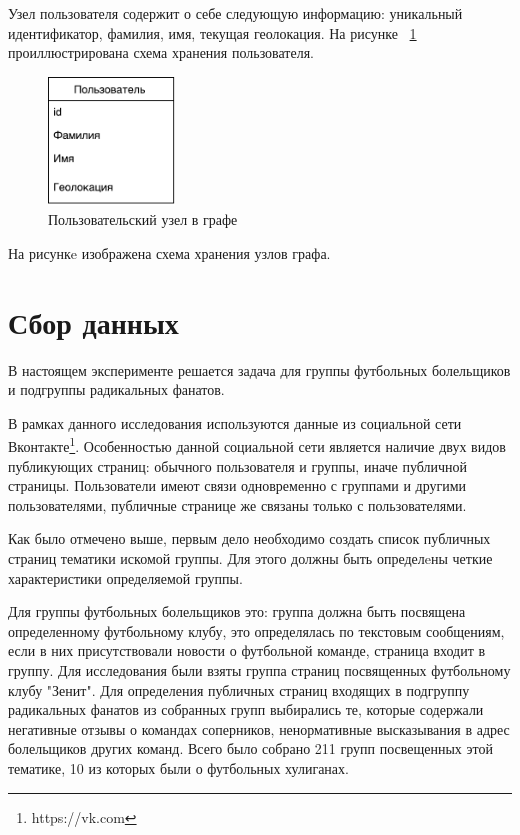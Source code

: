 \documentclass[annotation,times,page4]{itmo-student-thesis}
\begin{document}
Узел пользователя содержит о себе следующую информацию: уникальный идентификатор, фамилия, имя, текущая геолокация. На рисунке ~\ref{fig:user} проиллюстрирована схема хранения пользователя.

\begin{figure}[!h]
\caption{Пользовательский узел в графе}
\label{fig:user}
\centering
\includegraphics[width=0.3\textwidth]{figs/user.pdf}
\end{figure}

\newpage
На рисункe изображена схема хранения узлов графа.    

\section{Сбор данных}
В настоящем эксперименте решается задача для группы футбольных болельщиков и подгруппы радикальных фанатов.

В рамках данного исследования используются данные из социальной сети Вконтакте\footnote{https://vk.com}. Особенностью данной социальной сети является наличие двух видов публикующих страниц: обычного пользователя и группы, иначе публичной страницы. Пользователи имеют связи одновременно с группами и другими пользователями, публичные странице же связаны только с пользователями. 

Как было отмечено выше, первым дело необходимо создать список публичных страниц тематики искомой группы. 
Для этого должны быть определeны четкие характеристики определяемой группы.

Для группы футбольных болельщиков это: группа должна быть посвящена определенному футбольному клубу, это определялась по текстовым сообщениям, если в них присутствовали новости о футбольной команде, страница входит в группу. Для исследования были взяты группа страниц посвященных футбольному клубу "Зенит". Для определения публичных страниц входящих в подгруппу радикальных фанатов из собранных групп выбирались те, которые  содержали негативные отзывы о командах соперников, ненормативные высказывания в адрес болельщиков других команд. Всего было собрано 211 групп посвещенных этой тематике, 10 из которых были о футбольных хулиганах.
\end{document}
